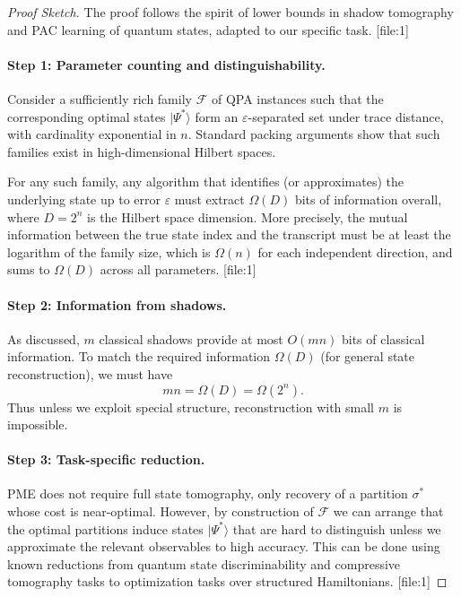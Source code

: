 \documentclass[11pt]{article}
\begin{document}
\begin{proof}[Proof Sketch]
The proof follows the spirit of lower bounds in shadow tomography and PAC learning of quantum states, adapted to our specific task. [file:1]

\paragraph{Step 1: Parameter counting and distinguishability.}
Consider a sufficiently rich family $\mathcal{F}$ of QPA instances such that the corresponding optimal states $|\Psi^*\rangle$ form an $\varepsilon$-separated set under trace distance, with cardinality exponential in $n$. Standard packing arguments show that such families exist in high-dimensional Hilbert spaces.

For any such family, any algorithm that identifies (or approximates) the underlying state up to error $\varepsilon$ must extract $\Omega(D)$ bits of information overall, where $D=2^n$ is the Hilbert space dimension. More precisely, the mutual information between the true state index and the transcript must be at least the logarithm of the family size, which is $\Omega(n)$ for each independent direction, and sums to $\Omega(D)$ across all parameters. [file:1]

\paragraph{Step 2: Information from shadows.}
As discussed, $m$ classical shadows provide at most $O(mn)$ bits of classical information. To match the required information $\Omega(D)$ (for general state reconstruction), we must have
\[
  mn = \Omega(D) = \Omega(2^n).
\]
Thus unless we exploit special structure, reconstruction with small $m$ is impossible.

\paragraph{Step 3: Task-specific reduction.}
PME does not require full state tomography, only recovery of a partition $\sigma^*$ whose cost is near-optimal. However, by construction of $\mathcal{F}$ we can arrange that the optimal partitions induce states $|\Psi^*\rangle$ that are hard to distinguish unless we approximate the relevant observables to high accuracy. This can be done using known reductions from quantum state discriminability and compressive tomography tasks to optimization tasks over structured Hamiltonians. [file:1]


\end{proof}
\end{document}
